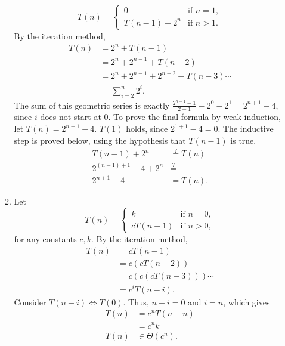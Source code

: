 \documentclass[12pt]{article}
\begin{document}
\begin{enumerate}
\begin{enumerate}
\[            T(n) = \begin{cases}
                0 &\text{if } n = 1, \\
                T(n - 1) + 2^{n} &\text{if } n > 1.
            \end{cases}
        \] By the iteration method,
        \begin{align*}
            T(n) &= 2^{n} + T(n - 1) \\
            &= 2^{n} + 2^{n - 1} + T(n - 2) \\
            &= 2^{n} + 2^{n - 1} + 2^{n - 2} + T(n - 3) \cdots \\
            &= \sum_{i = 2}^{n} 2^{i}.
        \end{align*}
        The sum of this geometric series is exactly $\frac{2^{n + 1} - 1}{2 - 1} - 2^{0} - 2^{1} = 2^{n + 1} - 4$, since $i$ does not start at $0$. To prove the final formula by weak induction, let $T(n) = 2^{n + 1} - 4$. $T(1)$ holds, since $2^{1 + 1} - 4 = 0$. The inductive step is proved below, using the hypothesis that $T(n - 1)$ is true.
        \begin{align*}
            T(n - 1) + 2^{n} &\stackrel{?}{=} T(n) \\
            2^{(n - 1) + 1} - 4 + 2^{n} &\stackrel{?}{=} \\
            2^{n + 1} - 4 &= T(n).
        \end{align*}
        \item\label{ex:4c} Let \[
            T(n) = \begin{cases}
                k &\text{if } n = 0, \\
                cT(n - 1) &\text{if } n > 0,
            \end{cases}
        \] for any constants $c, k$. By the iteration method,
        \begin{align*}
            T(n) &= cT(n - 1) \\
            &= c(cT(n - 2)) \\
            &= c(c(cT(n - 3))) \cdots \\
            &= c^{i} T(n - i).
        \end{align*}
        Consider $T(n - i) \Leftrightarrow T(0)$. Thus, $n - i = 0$ and $i = n$, which gives
        \begin{align*}
            T(n) &= c^{n} T(n - n)  \\
            &= c^{n} k \\
            T(n) &\in \Theta(c^{n}).
        \end{align*}

\end{enumerate}
\end{enumerate}
\end{document}
